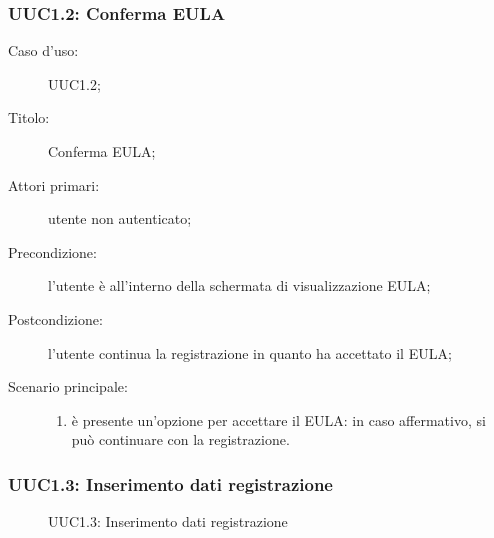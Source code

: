 \documentclass[../../../analisi-dei-requisiti.tex]{subfiles}
\begin{document}
\subsubsection{UUC1.2: Conferma EULA}%
\label{subs:UUC1.2}
\begin{description}
  \item[Caso d'uso:] UUC1.2;
  \item[Titolo:] Conferma EULA\@;
  \item[Attori primari:] utente non autenticato;
  \item[Precondizione:] l'utente è all'interno della schermata di visualizzazione EULA\@;
  \item[Postcondizione:] l'utente continua la registrazione in quanto ha accettato il EULA\@;
  \item[Scenario principale:]
        \begin{enumerate}
          \item è presente un'opzione per accettare il EULA\@: in caso affermativo, si può continuare con la registrazione.
        \end{enumerate}
\end{description}

\subsubsection{UUC1.3: Inserimento dati registrazione}%
\label{subs:UUC1.3}

\begin{figure}[H]
  \centering
  \caption{UUC1.3: Inserimento dati registrazione}%
  \label{fig:uuc1_3}
\end{figure}
\end{document}

